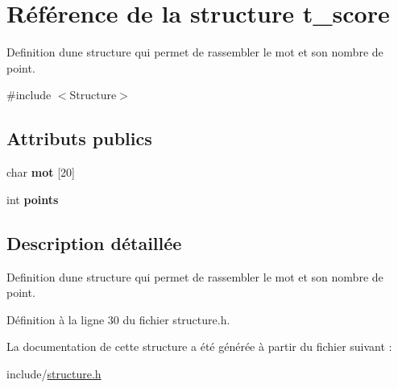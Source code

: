 \hypertarget{structt__score}{}\section{Référence de la structure t\+\_\+score}
\label{structt__score}


Definition d\textquotesingle{}une structure qui permet de rassembler le mot et son nombre de point.  




{\ttfamily \#include $<$Structure$>$}

\subsection*{Attributs publics}
\begin{DoxyCompactItemize}
\item 
\hypertarget{structt__score_abd797278aa1e44c0c12eaf3ff109807c}{}char {\bfseries mot} \mbox{[}20\mbox{]}\label{structt__score_abd797278aa1e44c0c12eaf3ff109807c}

\item 
\hypertarget{structt__score_afee8a31bb8ce610726a882842f15b29a}{}int {\bfseries points}\label{structt__score_afee8a31bb8ce610726a882842f15b29a}

\end{DoxyCompactItemize}


\subsection{Description détaillée}
Definition d\textquotesingle{}une structure qui permet de rassembler le mot et son nombre de point. 

Définition à la ligne 30 du fichier structure.\+h.



La documentation de cette structure a été générée à partir du fichier suivant \+:\begin{DoxyCompactItemize}
\item 
include/\hyperlink{structure_8h}{structure.\+h}\end{DoxyCompactItemize}
